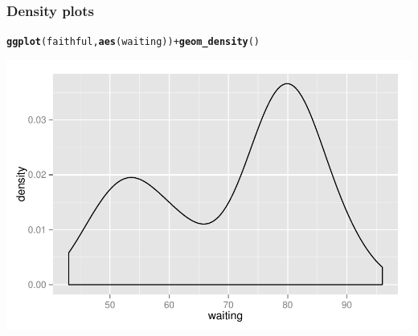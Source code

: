 \documentclass{beamer}\usepackage[]{graphicx}\usepackage[]{color}
\makeatletter
\newcommand{\hlopt}[1]{\textcolor[rgb]{0,0,0}{#1}}%
\newcommand{\hlstd}[1]{\textcolor[rgb]{0.345,0.345,0.345}{#1}}%
\newcommand{\hlkwd}[1]{\textcolor[rgb]{0.737,0.353,0.396}{\textbf{#1}}}%
\newenvironment{kframe}{%
 \def\at@end@of@kframe{}%
 \ifinner\ifhmode%
  \def\at@end@of@kframe{\end{minipage}}%
  \begin{minipage}{\columnwidth}%
 \fi\fi%
 \def\FrameCommand##1{\hskip\@totalleftmargin \hskip-\fboxsep
 \colorbox{shadecolor}{##1}\hskip-\fboxsep
     \hskip-\linewidth \hskip-\@totalleftmargin \hskip\columnwidth}%
 \MakeFramed {\advance\hsize-\width
   \@totalleftmargin\z@ \linewidth\hsize
   \@setminipage}}%
 {\par\unskip\endMakeFramed%
 \at@end@of@kframe}
\newenvironment{knitrout}{}{} %
\makeatother
\begin{document}
\begin{frame}[fragile]
\frametitle{Density plots}
\begin{knitrout}\footnotesize
{}\color{fgcolor}\begin{kframe}
\begin{alltt}
\hlkwd{ggplot}\hlstd{(faithful,} \hlkwd{aes}\hlstd{(waiting))} \hlopt{+} \hlkwd{geom_density}\hlstd{()}
\end{alltt}
\end{kframe}

{\centering \includegraphics[width=.75\linewidth]{figure/densityone_} 

}



\end{knitrout}

\end{frame}

\end{document}
